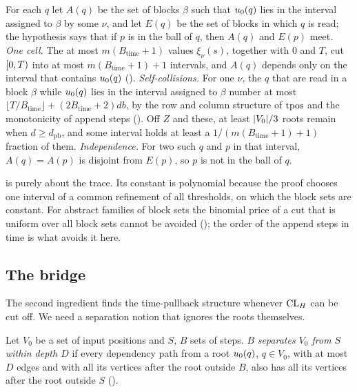 \begin{outline}
For each $q$ let $A(q)$ be the set of blocks $\beta$ such that $u_0(q)$ lies in the interval assigned to $\beta$ by some $\nu$, and
let $E(q)$ be the set of blocks in which $q$ is read; the hypothesis says that if $p$ is in the ball of $q$, then $A(q)$ and $E(p)$
meet. \emph{One cell.} The at most $m(B_{\mathrm{time}}+1)$ values $\xi_\nu(s)$, together with $0$ and $T$, cut $[0,T)$ into at
most $m(B_{\mathrm{time}}+1)+1$ intervals, and $A(q)$ depends only on the interval that contains $u_0(q)$
(). \emph{Self-collisions.} For one $\nu$, the $q$ that are read in a block $\beta$ while
$u_0(q)$ lies in the interval assigned to $\beta$ number at most $\lfloor T/B_{\mathrm{time}}\rfloor+(2B_{\mathrm{time}}+2)db$, by the
row and column structure of $\mathrm{tpos}$ and the monotonicity of append steps (). Off $Z$ and
these, at least $\lvert V_0 \rvert/3$ roots remain when $d\ge d_{\mathrm{pb}}$, and some interval holds at least a
$1/(m(B_{\mathrm{time}}+1)+1)$ fraction of them. \emph{Independence.} For two such $q$ and $p$ in that interval, $A(q)=A(p)$ is
disjoint from $E(p)$, so $p$ is not in the ball of $q$.
\end{outline}

 is purely about the trace. Its constant is polynomial because the proof chooses one interval of a common
refinement of all thresholds, on which the block sets are constant. For abstract families of block sets the binomial price of a cut
that is uniform over all block sets cannot be avoided (); the order of the append steps
in time is what avoids it here.

\subsection{The bridge}

The second ingredient finds the time-pullback structure whenever $\mathrm{CL}_H$ can be cut off. We need a separation notion that
ignores the roots themselves.

\begin{definition}\label{def:ballsep}
Let $V_0$ be a set of input positions and $S$, $B$ sets of steps. $B$ \emph{separates $V_0$ from $S$ within depth $D$} if every
dependency path from a root $u_0(q)$, $q\in V_0$, with at most $D$ edges and with all its vertices after the root outside $B$,
also has all its vertices after the root outside $S$ ().
\end{definition}


